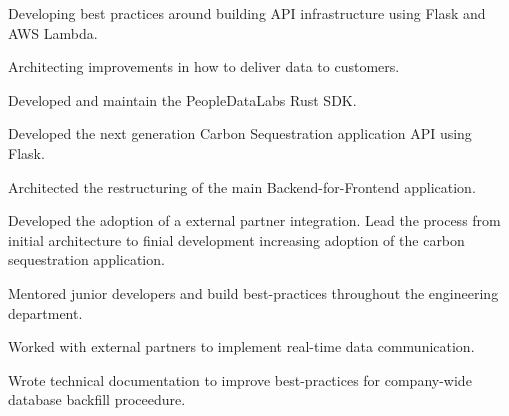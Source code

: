 \documentclass{bluefin_cv}
\begin{document}
\begin{bfcvlist}
    \item Developing best practices around building API infrastructure using Flask and AWS Lambda.
    \item Architecting improvements in how to deliver data to customers.
    \item Developed and maintain the PeopleDataLabs Rust SDK.
\end{bfcvlist}

\begin{bfcvlist}
    \item Developed the next generation Carbon Sequestration application API using Flask.
    \item Architected the restructuring of the main Backend-for-Frontend application.
    \item Developed the adoption of a external partner integration. Lead the process from initial architecture to finial development increasing adoption of the carbon sequestration application.
    \item Mentored junior developers and build best-practices throughout the engineering department.
    \item Worked with external partners to implement real-time data communication.
    \item Wrote technical documentation to improve best-practices for company-wide database backfill proceedure.
\end{bfcvlist}
\end{document}
